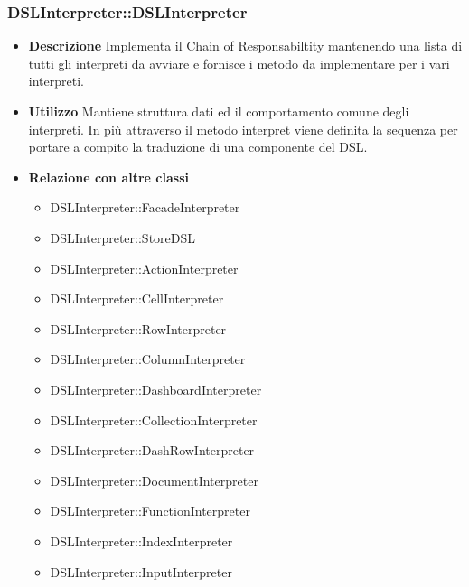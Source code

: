 \subsubsection{DSLInterpreter::DSLInterpreter}
\begin{itemize}
\item \textbf{Descrizione}
  Implementa il Chain of Responsabiltity mantenendo una lista di tutti gli interpreti da avviare e fornisce i metodo da implementare per i vari interpreti.
\item \textbf{Utilizzo}
  Mantiene struttura dati ed il comportamento comune degli interpreti. In più attraverso il metodo interpret viene definita la sequenza per portare a compito la traduzione di una componente del DSL.
\item \textbf{Relazione con altre classi} \hfill
  \begin{itemize}
  \item DSLInterpreter::FacadeInterpreter
  \item DSLInterpreter::StoreDSL
  \item DSLInterpreter::ActionInterpreter
  \item DSLInterpreter::CellInterpreter
  \item DSLInterpreter::RowInterpreter
  \item DSLInterpreter::ColumnInterpreter
  \item DSLInterpreter::DashboardInterpreter
  \item DSLInterpreter::CollectionInterpreter
  \item DSLInterpreter::DashRowInterpreter
  \item DSLInterpreter::DocumentInterpreter
  \item DSLInterpreter::FunctionInterpreter
  \item DSLInterpreter::IndexInterpreter
  \item DSLInterpreter::InputInterpreter
  \end{itemize}
\end{itemize}

